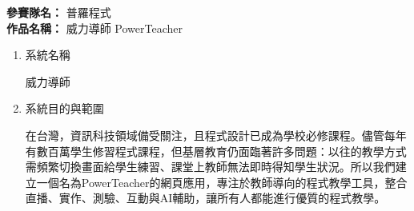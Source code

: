 \documentclass[12pt]{article}
\begin{document}
\date{}
\usetikzlibrary{automata, positioning, arrows}
{}

\noindent
\textbf{參賽隊名：} 普羅程式 \\
\textbf{作品名稱：} 威力導師 PowerTeacher \\

\begin{enumerate}
  \setlength{\parindent}{2em}
  \item 系統名稱
  \par 威力導師
  \item 系統目的與範圍
  \par 在台灣，資訊科技領域備受關注，且程式設計已成為學校必修課程。儘管每年有數百萬學生修習程式課程，但基層教育仍面臨著許多問題：以往的教學方式需頻繁切換畫面給學生練習、課堂上教師無法即時得知學生狀況。所以我們建立一個名為PowerTeacher的網頁應用，專注於教師導向的程式教學工具，整合直播、實作、測驗、互動與AI輔助，讓所有人都能進行優質的程式教學。


\end{enumerate}
\end{document}
